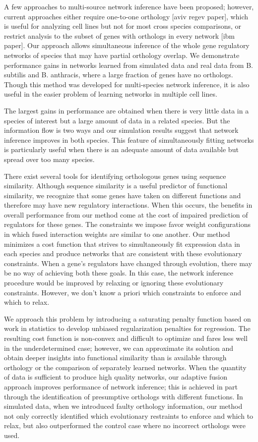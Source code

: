 \documentclass[11pt]{article}
\begin{document}
A few approaches to multi-source network inference have been proposed; however, current approaches either require one-to-one orthology [aviv regev paper], which is useful for analyzing cell lines but not for most cross species comparisons, or restrict analysis to the subset of genes with orthologs in every network [ibm paper]. Our approach allows simultaneous inference of the whole gene regulatory networks of species that may have partial orthology overlap. We demonstrate performance gains in networks learned from simulated data and real data from B. subtilis and B. anthracis, where a large fraction of genes have no orthologs. Though this method was developed for multi-species network inference, it is also useful in the easier problem of learning networks in multiple cell lines. 

The largest gains in performance are obtained when there is very little data in a species of interest but a large amount of data in a related species. But the information flow is two ways and our simulation results suggest that network inference improves in both species. This feature of simultaneously fitting networks is particularly useful when there is an adequate amount of data available but spread over too many species.

There exist several tools for identifying orthologous genes using sequence similarity. Although sequence similarity is a useful predictor of functional similarity, we recognize that some genes have taken on different functions and therefore may have new regulatory interactions. When this occurs, the benefits in overall performance from our method come at the cost of impaired prediction of regulators for these genes. The constraints we impose favor weight configurations in which fused interaction weights are similar to one another. Our method minimizes a cost function that strives  to simultaneously fit expression data in each species and produce networks that are consistent with these evolutionary constraints. When a gene's regulators have changed through evolution, there may be no way of achieving both these goals. In this case, the network inference procedure would be improved by relaxing or ignoring these evolutionary constraints. However, we don't know a priori which constraints to enforce and which to relax.  

We approach this problem by introducing a saturating penalty function based on work in statistics to develop unbiased regularization penalties for regression. The resulting cost function is non-convex and difficult to optimize and fares less well in the underdetermined case; however, we can approximate its solution and obtain deeper insights into functional similarity than is available through orthology or the comparison of separately learned networks. When the quantity of data is sufficient to produce high quality networks, our adaptive fusion approach improves performance of network inference; this is achieved in part through the identification of presumptive orthologs with different functions. In simulated data, when we introduced faulty orthology information, our method not only correctly identified which evolutionary restraints to enforce and which to relax, but also outperformed the control case where no incorrect orthologs were used. 
\end{document}
